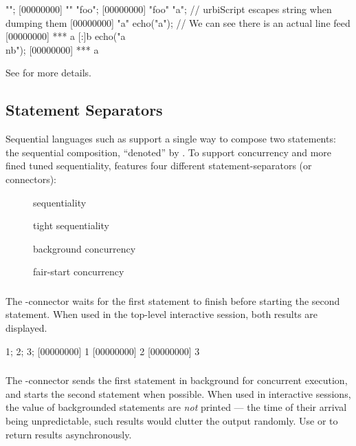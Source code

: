 \begin{urbiscript}[firstnumber=last]
"";
[00000000] ""
"foo";
[00000000] "foo"
"a\nb"; // urbiScript escapes string when dumping them
[00000000] "a\nb"
echo("a\nb"); // We can see there is an actual line feed
[00000000] *** a
[:]b
echo("a\\nb");
[00000000] *** a\nb
\end{urbiscript}

See  for more details.

\subsection{Statement Separators}
\label{sec:lang:separators}

Sequential languages such as \Cxx support a single way to compose two
statements: the sequential composition, ``denoted'' by \samp{;}.  To
support concurrency and more fined tuned sequentiality, \us features
four different statement-separators (or connectors):
\begin{description}
\item[\samp{;}] sequentiality
\item[\samp{|}] tight sequentiality
\item[\samp{,}] background concurrency
\item[\samp{\&}] fair-start concurrency
\end{description}

\subsubsection{\samp{;}}

The \samp{;}-connector waits for the first statement to finish before
starting the second statement.  When used in the top-level interactive
session, both results are displayed.

\begin{urbiscript}[firstnumber=last]
1; 2; 3;
[00000000] 1
[00000000] 2
[00000000] 3
\end{urbiscript}

\subsubsection{\samp{,}}

The \samp{,}-connector sends the first statement in background for
concurrent execution, and starts the second statement when possible.
When used in interactive sessions, the value of backgrounded
statements are \emph{not} printed --- the time of their arrival being
unpredictable, such results would clutter the output randomly.  Use
 or  to return results
asynchronously.

